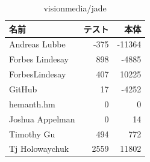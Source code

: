 \begin{table}[htb]
\begin{center}
\caption{visionmedia/jade}
\begin{tabular}{|l|r|r|} \hline 
名前 & テスト & 本体 \\ \hline \hline
Andreas Lubbe & -375 & -11364\\ \hline
Forbes Lindesay & 898 & -4885\\ \hline
ForbesLindesay & 407 & 10225\\ \hline
GitHub & 17 & -4252\\ \hline
hemanth.hm & 0 & 0\\ \hline
Joshua Appelman & 0 & 14\\ \hline
Timothy Gu & 494 & 772\\ \hline
Tj Holowaychuk & 2559 & 11802\\ \hline
\end{tabular}
\end{center}
\end{table}

